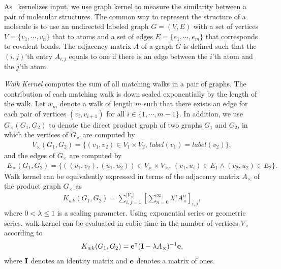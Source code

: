 {

As \mmcrf\ kernelizes input, we use graph kernel to measure the similarity between a pair of molecular structures.
The common way to represent the structure of a molecule is to use an undirected labeled graph $G=(V,E)$ with a set of vertices $V=\{v_1,\cdots,v_n\}$ that to atoms and a set of edges $E=\{e_1,\cdots,e_m\}$ that corresponds to covalent bonds.
The adjacency matrix $A$ of a graph $G$ is defined such that the $(i,j)$'th entry $A_{i,j}$ equals to one if there is an edge between the $i$'th atom and the $j$'th atom.

\textit{Walk Kernel} \citep{Kashima03marginalized,Gartner03a} computes the sum of all matching walks in a pair of graphs. 
The contribution of each matching walk is down scaled exponentially by the length of the walk.
Let $w_m$ denote a walk of length $m$ such that there exists an edge for each pair of vertices $(v_i,v_{i+1})$ for all $i\in\{1,\cdots,m-1\}$.
In addition, we use $G_{\times}(G_1,G_2)$ to denote the direct product graph of two graphs $G_1$ and $G_2$, in which the vertices of $G_{\times}$ are computed by 
\begin{align*}
	V_{\times}(G_1,G_2) = \{(v_1,v_2)\in V_1\times V_2,\, label(v_1)=label(v_2)\},
\end{align*}
and the edges of $G_{\times}$ are computed by
\begin{align*}
	E_{\times}(G_1,G_2) = \{((v_1,v_2),(u_1,u_2))\in V_{\times}\times V_{\times},\, (v_1,u_i)\in E_1\wedge (v_2,u_2)\in E_2\}.
\end{align*}
Walk kernel can be equivalently expressed in terms of the adjacency matrix $A_{\times}$ of the product graph $G_{\times}$ as
\begin{align*}
	K_{wk}(G_1,G_2) = \sum_{i,j=1}^{|V_{\times}|}\left[\sum_{n=0}^{\infty}\lambda^{n}A_{\times}^n\right]_{i,j},
\end{align*}
where $0<\lambda\le1$ is a scaling parameter.
Using exponential series or geometric series, walk kernel can be evaluated in cubic time \citep{Gartner03a} in the number of vertices $V_{\times}$ according to
\begin{align*}
	K_{wk}(G_1,G_2) = \mathbf {e}^{\intercal}(\mathbf{I}-\lambda A_{\times})^{-1}\mathbf {e},
\end{align*}
where $\mathbf{I}$ denotes an identity matrix and $\mathbf {e}$ denotes a matrix of ones.

}
